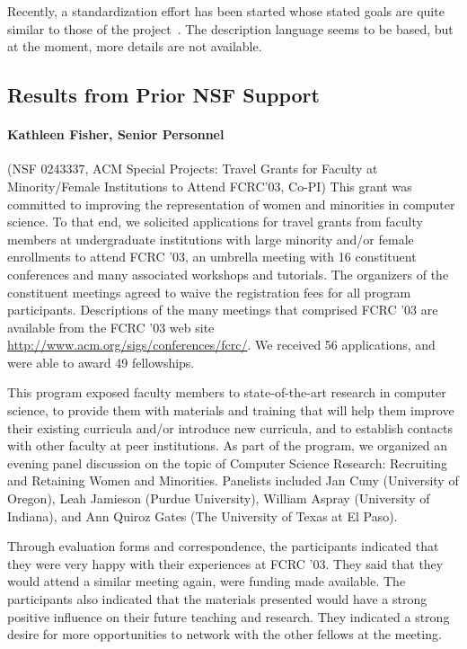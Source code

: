 \documentclass[11pt]{article}
\begin{document}
Recently, a standardization effort has been started whose stated goals are quite similar to those of the \pads{} project~\cite{dfdl}. The description
language seems to be \xml{} based, but at the moment, more details are 
not available.

\subsection{Results from Prior NSF Support}
\label{ssec:results}

\paragraph*{Kathleen Fisher, Senior Personnel} (NSF 0243337, ACM Special Projects: 
Travel Grants for Faculty at Minority/Female Institutions to Attend
FCRC'03, Co-PI) This grant was committed to improving the representation of women and
minorities in computer science. To that end, we solicited applications
for travel grants from faculty members at undergraduate institutions
with large minority and/or female enrollments to attend FCRC '03, an
umbrella meeting with 16 constituent conferences and many associated
workshops and tutorials.  The organizers of the constituent meetings agreed to waive
the registration fees for all program participants. 
Descriptions of the many meetings that
comprised FCRC '03 are available from the FCRC '03 web site 
\url{http://www.acm.org/sigs/conferences/fcrc/}.  We
received 56 applications, and were able to award 49
fellowships.

This program exposed faculty members to state-of-the-art research in
computer science, to provide them with materials and training that
will help them improve their existing curricula and/or introduce new
curricula, and to establish contacts with other faculty at peer
institutions.  As part of the program, we organized an evening panel
discussion on the topic of Computer Science Research: Recruiting and
Retaining Women and Minorities.  Panelists included Jan Cuny
(University of Oregon), Leah Jamieson (Purdue University), William
Aspray (University of Indiana), and Ann Quiroz Gates (The University
of Texas at El Paso).  

Through evaluation forms and correspondence, the participants
indicated that they were very happy with their experiences at
FCRC '03. They said that they would attend a similar meeting again,
were funding made available. The participants also indicated that the
materials presented would have a strong positive influence on their
future teaching and research.  They indicated a strong desire for more
opportunities to network with the other fellows at the meeting.
\end{document}

